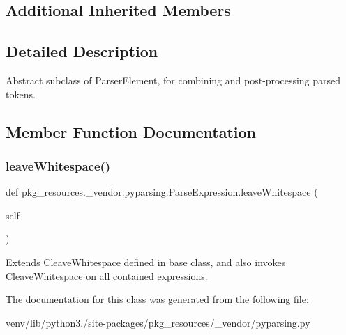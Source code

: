 \subsection*{Additional Inherited Members}


\subsection{Detailed Description}
\begin{DoxyVerb}Abstract subclass of ParserElement, for combining and post-processing parsed tokens.
\end{DoxyVerb}
 

\subsection{Member Function Documentation}
\mbox{\label{classpkg__resources_1_1__vendor_1_1pyparsing_1_1_parse_expression_a92305dfced0c62b9242cd2546c745ef5}} 
\subsubsection{\texorpdfstring{leave\+Whitespace()}{leaveWhitespace()}}
{\footnotesize\ttfamily def pkg\+\_\+resources.\+\_\+vendor.\+pyparsing.\+Parse\+Expression.\+leave\+Whitespace (\begin{DoxyParamCaption}\item[{}]{self }\end{DoxyParamCaption})}

\begin{DoxyVerb}Extends C{leaveWhitespace} defined in base class, and also invokes C{leaveWhitespace} on
   all contained expressions.\end{DoxyVerb}
 

The documentation for this class was generated from the following file\+:\begin{DoxyCompactItemize}
\item 
venv/lib/python3./site-\/packages/pkg\+\_\+resources/\+\_\+vendor/pyparsing.\+py\end{DoxyCompactItemize}
